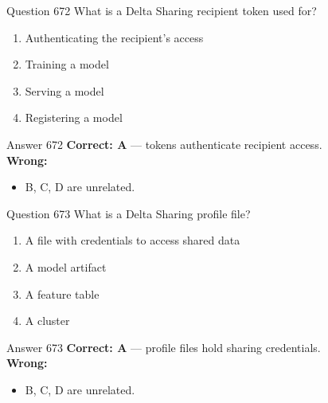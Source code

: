 \documentclass[aspectratio=169,11pt]{beamer}
\begin{document}
	\begin{frame}{Question 672}
		What is a Delta Sharing recipient token used for?
		\begin{enumerate}[label=\Alph*.]
			\item Authenticating the recipient's access
			\item Training a model
			\item Serving a model
			\item Registering a model
		\end{enumerate}
	\end{frame}
	\begin{frame}{Answer 672}
		\textbf{Correct: A} --- tokens authenticate recipient access.\\
		\vspace{0.5em}
		\textbf{Wrong:}
		\begin{itemize}
			\item B, C, D are unrelated.
		\end{itemize}
	\end{frame}
	
	\begin{frame}{Question 673}
		What is a Delta Sharing profile file?
		\begin{enumerate}[label=\Alph*.]
			\item A file with credentials to access shared data
			\item A model artifact
			\item A feature table
			\item A cluster
		\end{enumerate}
	\end{frame}
	\begin{frame}{Answer 673}
		\textbf{Correct: A} --- profile files hold sharing credentials.\\
		\vspace{0.5em}
		\textbf{Wrong:}
		\begin{itemize}
			\item B, C, D are unrelated.
		\end{itemize}
	\end{frame}
	
\end{document}
